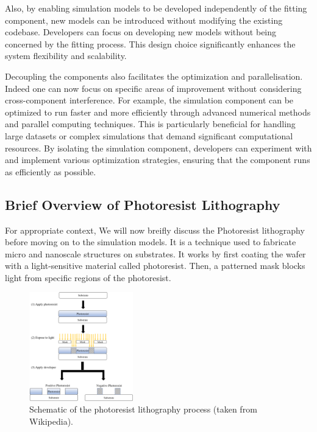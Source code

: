 \medskip

Also, by enabling simulation models to be developed independently of the fitting component, 
new models can be introduced without modifying the existing codebase. Developers can 
focus on developing new models without being concerned by the fitting process. 
This design choice significantly enhances the system flexibility and scalability.

\medskip

Decoupling the components also facilitates the optimization and parallelisation. Indeed one can now focus on specific areas of improvement without
considering cross-component interference. For example, the simulation component can be optimized to
run faster and more efficiently through advanced numerical methods and parallel 
computing techniques. This is particularly beneficial for handling large datasets or complex simulations that demand significant 
computational resources. By isolating the simulation component, developers can experiment with and implement various optimization strategies, 
ensuring that the component runs as efficiently as possible.

\medskip

\subsection{Brief Overview of Photoresist Lithography}

For appropriate context, We will now breifly discuss the Photoresist lithography before moving
 on to the simulation models. It is a technique used to fabricate micro and nanoscale structures on substrates.
It works by first coating the wafer with a light-sensitive material called photoresist. 
Then, a patterned mask blocks light from specific regions of the photoresist.

\begin{figure}[h]
\centering
\includegraphics[width=0.4\textwidth]{images/photo_resist.png}
\caption{Schematic of the photoresist lithography process (taken from Wikipedia).}
\label{fig:photo_resist}
\end{figure}

